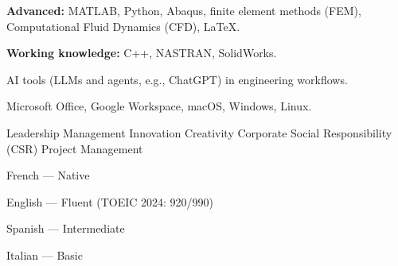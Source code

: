 
{\small
{}
}
\vspace{0.6em}

{\small \textbf{Advanced:} MATLAB, Python, Abaqus, finite element methods (FEM), Computational Fluid Dynamics (CFD), LaTeX.

\vspace{4pt}
\textbf{Working knowledge:} C++, NASTRAN, SolidWorks.

\vspace{4pt}
AI tools (LLMs and agents, e.g., ChatGPT) in engineering workflows.

\vspace{4pt}
Microsoft Office, Google Workspace, macOS, Windows, Linux.
}
\vspace{0.6em}
{\small Leadership \textbullet{} Management \textbullet{} Innovation \textbullet{} Creativity \textbullet{} Corporate Social Responsibility (CSR) \textbullet{} Project Management}
\vspace{0.6em}

{\small French — Native

\vspace{2pt}
English — Fluent (TOEIC 2024: 920/990)

\vspace{2pt}
Spanish — Intermediate

\vspace{2pt}
Italian — Basic

}

